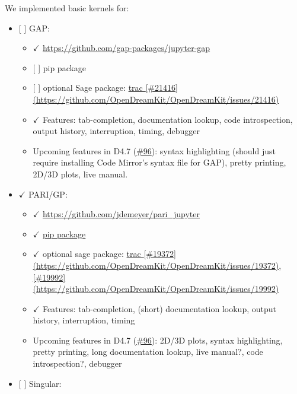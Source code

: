 We implemented basic kernels for:

\begin{itemize}
\tightlist
\item
  {[} {]} GAP:

  \begin{itemize}
  \tightlist
  \item
    \(\checkmark\) \url{https://github.com/gap-packages/jupyter-gap}
  \item
    {[} {]} pip package
  \item
    {[} {]} optional Sage package:
    \href{https://trac.sagemath.org/ticket/21416}{trac
    {[}\#21416{]}(https://github.com/OpenDreamKit/OpenDreamKit/issues/21416)}
  \item
    \(\checkmark\) Features: tab-completion, documentation lookup, code
    introspection, output history, interruption, timing, debugger
  \item
    Upcoming features in D4.7
    (\href{https://github.com/OpenDreamKit/OpenDreamKit/issues/96}{\#96}):
    syntax highlighting (should just require installing Code Mirror's
    syntax file for GAP), pretty printing, 2D/3D plots, live manual.
  \end{itemize}
\item
  \(\checkmark\) PARI/GP:

  \begin{itemize}
  \tightlist
  \item
    \(\checkmark\) \url{https://github.com/jdemeyer/pari_jupyter}
  \item
    \(\checkmark\) \href{https://pypi.python.org/pypi/pari_jupyter}{pip
    package}
  \item
    \(\checkmark\) optional sage package:
    \href{https://trac.sagemath.org/ticket/19372}{trac
    {[}\#19372{]}(https://github.com/OpenDreamKit/OpenDreamKit/issues/19372)},
    \href{https://trac.sagemath.org/ticket/19992}{{[}\#19992{]}(https://github.com/OpenDreamKit/OpenDreamKit/issues/19992)}
  \item
    \(\checkmark\) Features: tab-completion, (short) documentation
    lookup, output history, interruption, timing
  \item
    Upcoming features in D4.7
    (\href{https://github.com/OpenDreamKit/OpenDreamKit/issues/96}{\#96}):
    2D/3D plots, syntax highlighting, pretty printing, long
    documentation lookup, live manual?, code introspection?, debugger
  \end{itemize}
\item
  {[} {]} Singular:


\end{itemize}
